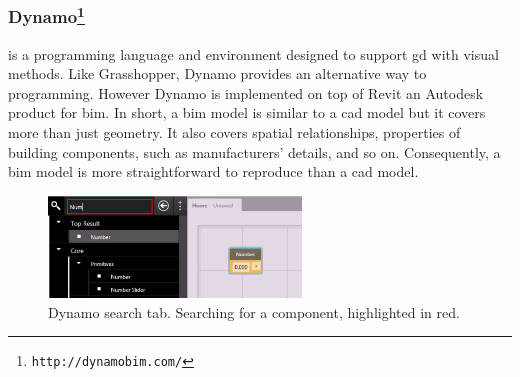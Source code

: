 \subsubsection{Dynamo\protect\footnote{\texttt{http://dynamobim.com/}}} is a programming language and environment designed to support \ac{gd} with visual methods. Like Grasshopper, Dynamo provides an alternative way to programming. However Dynamo is implemented on top of Revit an Autodesk product for \ac{bim}. In short, a \ac{bim} model is similar to a \ac{cad} model but it covers more than just geometry. It also covers spatial relationships, properties of building components, such as manufacturers' details, and so on. Consequently, a \ac{bim} model is more straightforward to reproduce than a \ac{cad} model. 

\begin{figure}
  \vspace{-35pt}
  \begin{center}
    \includegraphics[width=0.6\textwidth]{img/dynam-tab}
  \end{center}
  \vspace{-15pt}
 \caption{Dynamo search tab. Searching for a component, highlighted in red.}  
  \vspace{-15pt}
    \label{fig:dynam}
\end{figure}

